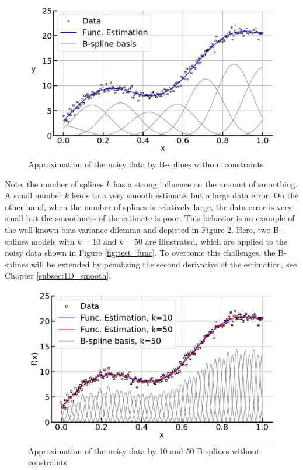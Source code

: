 \documentclass[10pt,a4paper]{report}
\begin{document}
\begin{figure}[H]
	\centering
	\includegraphics[width=\columnwidth]{../thesisplots/smooth_bf.pdf}
	\caption{Approximation of the noisy data by B-splines without constraints}
	\label{fig:smooth_bf}
\end{figure}


Note, the number of splines $k$ has a strong influence on the amount of smoothing. A small number $k$ leads to a very smooth estimate, but a large data error. On the other hand, when the number of splines is relatively large, the data error is very small but the smoothness of the estimate is poor. This behavior is an example of the well-known bias-variance dilemma and depicted in Figure \ref{fig:smooth_bf_large}. \cite{sammut2011}
Here, two B-splines models with $k=10$ and $k=50$ are illustrated, which are applied to the noisy data shown in Figure \ref{fig:test_func}. To overcome this challenges, the B-splines will be extended by penalizing the second derivative of the estimation, see Chapter \ref{subsec:1D_smooth}. 

\begin{figure}[H]
	\centering
	\includegraphics[width=\linewidth]{../thesisplots/smooth_wiggly_bf.pdf}
	\caption{Approximation of the noisy data by 10 and 50 B-splines without constraints}
	\label{fig:smooth_bf_large}
\end{figure}
\end{document}
